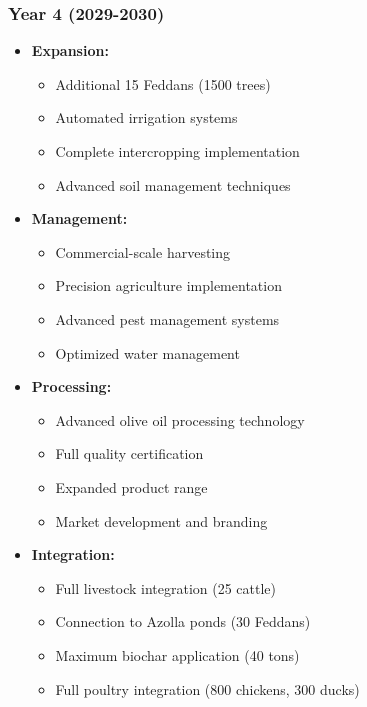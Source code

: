 \subsubsection{Year 4 (2029-2030)}
\begin{itemize}
    \item \textbf{Expansion:}
    \begin{itemize}
        \item Additional 15 Feddans (1500 trees)
        \item Automated irrigation systems
        \item Complete intercropping implementation
        \item Advanced soil management techniques
    \end{itemize}
    \item \textbf{Management:}
    \begin{itemize}
        \item Commercial-scale harvesting
        \item Precision agriculture implementation
        \item Advanced pest management systems
        \item Optimized water management
    \end{itemize}
    \item \textbf{Processing:}
    \begin{itemize}
        \item Advanced olive oil processing technology
        \item Full quality certification
        \item Expanded product range
        \item Market development and branding
    \end{itemize}
    \item \textbf{Integration:}
    \begin{itemize}
        \item Full livestock integration (25 cattle)
        \item Connection to Azolla ponds (30 Feddans)
        \item Maximum biochar application (40 tons)
        \item Full poultry integration (800 chickens, 300 ducks)
    \end{itemize}
\end{itemize}

